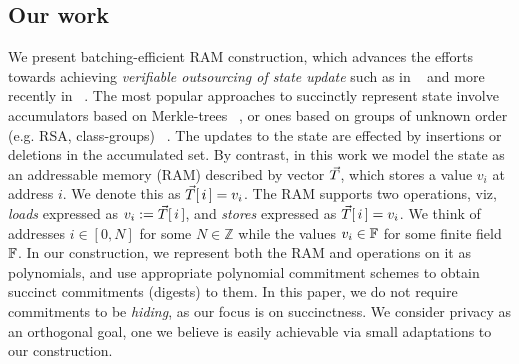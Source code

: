 \documentclass[sigconf]{acmart}
\begin{document}
\subsection{Our work}\label{subsec:ourwork}
We present batching-efficient RAM construction, which advances the efforts
towards achieving {\em verifiable outsourcing of state update} such as in ~\cite{EPRINT:BFRSBW13}
and more recently in ~\cite{USENIX:OWWB20, CCS:CFHKKO22}.
The most popular approaches to succinctly represent
state involve accumulators based on Merkle-trees ~\cite{C:Merkle87}, or ones based on groups of unknown order
(e.g. RSA, class-groups) ~\cite{C:CamLys02,C:BonBunFis19,USENIX:OWWB20, CCS:CFHKKO22}.
The updates to the state are effected by insertions or deletions in the  accumulated set.
By contrast, in this work we
model the state as an addressable memory (RAM) described by vector $\vec{T}$, which stores a value $v_i$ at address $i$.
We denote this as $\vec{T}[\,i\,]=v_i$. The RAM supports two operations, viz, {\em loads} expressed
as $v_i := \vec{T}[\,i\,]$, and {\em stores} expressed as $\vec{T}[\,i\,]=v_i$.
We think of addresses $i\in [0,N]$ for some $N\in \mathbb{Z}$ while the
values $v_i\in \mathbb{F}$ for some finite field $\mathbb{F}$. In our construction, we represent both the RAM and operations on it
as polynomials, and use appropriate polynomial commitment schemes to obtain succinct commitments (digests) to them.
In this paper, we do not require commitments to be {\em hiding}, as our focus is on succinctness.
We consider privacy as an orthogonal goal, one we believe is easily achievable
via small adaptations to our construction.\smallskip
\end{document}
